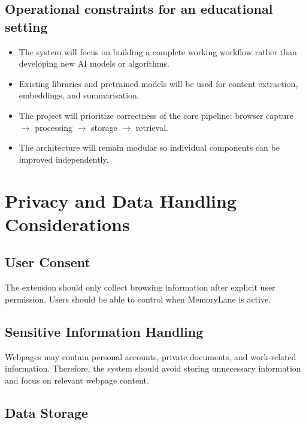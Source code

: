 \documentclass[11pt,a4paper]{article}
\begin{document}
\subsection{Operational constraints for an educational setting}

\begin{itemize}[leftmargin=0.7cm]

\item The system will focus on building a complete working workflow rather than developing new AI models or algorithms.

\item Existing libraries and pretrained models will be used for content extraction, embeddings, and summarisation.

\item The project will prioritize correctness of the core pipeline:
browser capture $\rightarrow$ processing $\rightarrow$ storage $\rightarrow$ retrieval.

\item The architecture will remain modular so individual components can be improved independently.

\end{itemize}


\section{Privacy and Data Handling Considerations}

\subsection{User Consent}

The extension should only collect browsing information after explicit user permission. Users should be able to control when MemoryLane is active.

\subsection{Sensitive Information Handling}

Webpages may contain personal accounts, private documents, and work-related information. Therefore, the system should avoid storing unnecessary information and focus on relevant webpage content.

\subsection{Data Storage}
\end{document}

